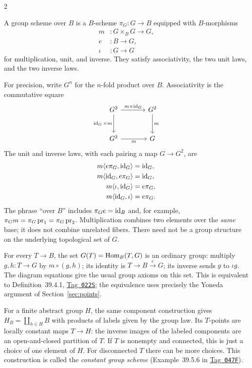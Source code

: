 \documentclass[12pt]{memoir}
\newcommand{\BGtag}[1]{\href{https://stacks.math.columbia.edu/tag/#1}{Tag~\texttt{#1}}}
\begin{document}
\begin{multicols}{2}
\begin{Def}\label{def:groupscheme}
A group scheme over $B$ is a $B$-scheme $\pi_G:G\to B$ equipped with
$B$-morphisms
\[
\begin{aligned}
 m&:G\times_B G\to G,\\
 e&:B\to G,\\
 \iota&:G\to G
\end{aligned}
\]
for multiplication, unit, and inverse. They satisfy associativity,
the two unit laws, and the two inverse laws.
\end{Def}
For precision, write $G^n$ for the $n$-fold product over $B$.
Associativity is the commutative square
\[
\begin{tikzcd}[column sep=large,row sep=large]
G^3 \arrow[r,"m\times\id_G"] \arrow[d,"\id_G\times m"']
 &G^2 \arrow[d,"m"]\\
G^2 \arrow[r,"m"'] &G
\end{tikzcd}
\]
The unit and inverse laws, with each pairing a map $G\to G^2$, are
\[
\begin{aligned}
m\langle e\pi_G,\operatorname{id}_G\rangle&=\operatorname{id}_G,\\
m\langle\operatorname{id}_G,e\pi_G\rangle&=\operatorname{id}_G,\\
m\langle\iota,\operatorname{id}_G\rangle&=e\pi_G,\\
m\langle\operatorname{id}_G,\iota\rangle&=e\pi_G.
\end{aligned}
\]
The phrase ``over $B$'' includes $\pi_Ge=\operatorname{id}_B$ and, for example,
$\pi_Gm=\pi_G\operatorname{pr}_1=\pi_G\operatorname{pr}_2$. Multiplication combines two elements
over the \emph{same} base; it does not combine unrelated fibers.
There need not be a group structure on the underlying topological set
of $G$.

For every $T\to B$, the set $G(T)=\operatorname{Hom}_B(T,G)$ is an ordinary group:
multiply $g,h:T\to G$ by $m\circ(g,h)$; its identity is
$T\to B\xrightarrow{e}G$; its inverse sends $g$ to $\iota g$.
The diagram equations give the usual group axioms on this set.
This is equivalent to Definition~39.4.1, \BGtag{022S}; the equivalence
uses precisely the Yoneda argument of Section~\ref{sec:points}.

For a finite abstract group $H$, the same component construction gives
$H_B=\coprod_{h\in H}B$ with products of labels given by the group
law. Its $T$-points are locally constant maps $T\to H$: the inverse
images of the labeled components are an open-and-closed partition of
$T$. If $T$ is nonempty and connected, this is just a choice of one
element of $H$. For disconnected $T$ there can be more choices.
This construction is called the \emph{constant group scheme}
(Example~39.5.6 in \BGtag{047F}).


\end{multicols}
\end{document}
